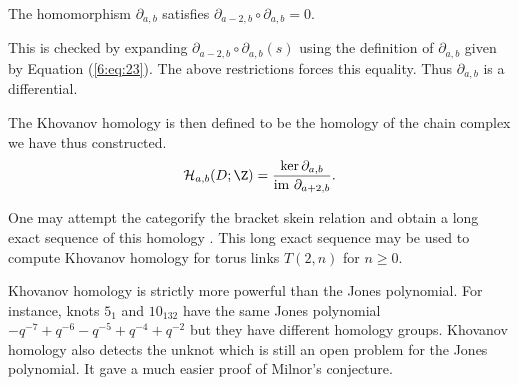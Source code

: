 \begin{theorem}
\label{sec:categ-left-hatcd-4}
The homomorphism $\partial_{a,b}$ satisfies $\partial_{a-2,b} \circ \partial_{a,b} = 0$.
\end{theorem}

This is checked by expanding $\partial_{a-2,b} \circ \partial_{a,b}(s)$ using the definition of $\partial_{a,b}$ given by Equation (\ref{6:eq:23}). The above restrictions forces this equality. Thus $\partial_{a,b}$ is a differential.

The Khovanov homology is then defined to be the homology of the chain complex we have thus constructed. 
\begin{equation}
\label{eq:24}
\mathcal{H}_{a,b}(D; \Z) = \frac{\ker\partial_{a,b}}{\text{im }\partial_{a+2,b}}.
\end{equation}

One may attempt the categorify the bracket skein relation and obtain a long exact sequence of this homology \cite{OlegViro2004}. This long exact sequence may be used to compute Khovanov homology for torus links $T(2,n)$ for $n \geq 0$.

Khovanov homology is strictly more powerful than the Jones polynomial. For instance, knots $5_1$ and $10_{132}$ have the same Jones polynomial $-q^{-7} + q^{-6} - q^{-5} + q^{-4} + q^{-2}$ but they have different homology groups. Khovanov homology also detects the unknot \cite{kronheimer2011khovanov} which is still an open problem for the Jones polynomial. It gave a much easier proof of Milnor's conjecture.